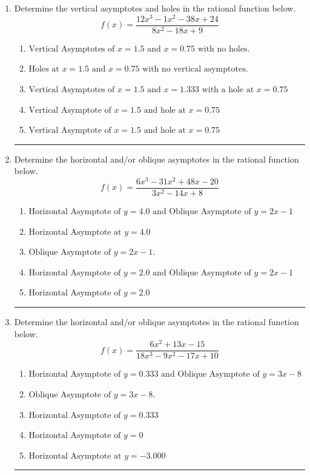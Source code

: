 \documentclass[14pt]{extbook}
\newcommand{\litem}[1]{\item#1\hspace*{-1cm}\rule{\textwidth}{0.4pt}}
\begin{document}
\begin{enumerate}
{\begin{enumerate}[label=\Alph*.]
\end{enumerate} }
\litem{
Determine the vertical asymptotes and holes in the rational function below.\[ f(x) = \frac{12x^{3} -1 x^{2} -38 x + 24}{8x^{2} -18 x + 9} \]\begin{enumerate}[label=\Alph*.]
\item \( \text{Vertical Asymptotes of } x = 1.5 \text{ and } x = 0.75 \text{ with no holes.} \)
\item \( \text{Holes at } x = 1.5 \text{ and } x = 0.75 \text{ with no vertical asymptotes.} \)
\item \( \text{Vertical Asymptotes of } x = 1.5 \text{ and } x = 1.333 \text{ with a hole at } x = 0.75 \)
\item \( \text{Vertical Asymptote of } x = 1.5 \text{ and hole at } x = 0.75 \)
\item \( \text{Vertical Asymptote of } x = 1.5 \text{ and hole at } x = 0.75 \)

\end{enumerate} }
\litem{
Determine the horizontal and/or oblique asymptotes in the rational function below.\[ f(x) = \frac{6x^{3} -31 x^{2} +48 x -20}{3x^{2} -14 x + 8} \]\begin{enumerate}[label=\Alph*.]
\item \( \text{Horizontal Asymptote of } y = 4.0 \text{ and Oblique Asymptote of } y = 2x -1 \)
\item \( \text{Horizontal Asymptote at } y = 4.0 \)
\item \( \text{Oblique Asymptote of } y = 2x -1. \)
\item \( \text{Horizontal Asymptote of } y = 2.0 \text{ and Oblique Asymptote of } y = 2x -1 \)
\item \( \text{Horizontal Asymptote of } y = 2.0  \)

\end{enumerate} }
\litem{
Determine the horizontal and/or oblique asymptotes in the rational function below.\[ f(x) = \frac{6x^{2} +13 x -15}{18x^{3} -9 x^{2} -17 x + 10} \]\begin{enumerate}[label=\Alph*.]
\item \( \text{Horizontal Asymptote of } y = 0.333 \text{ and Oblique Asymptote of } y = 3x -8 \)
\item \( \text{Oblique Asymptote of } y = 3x -8. \)
\item \( \text{Horizontal Asymptote of } y = 0.333  \)
\item \( \text{Horizontal Asymptote of } y = 0 \)
\item \( \text{Horizontal Asymptote at } y = -3.000 \)


\end{enumerate}}
\end{enumerate}
\end{document}
